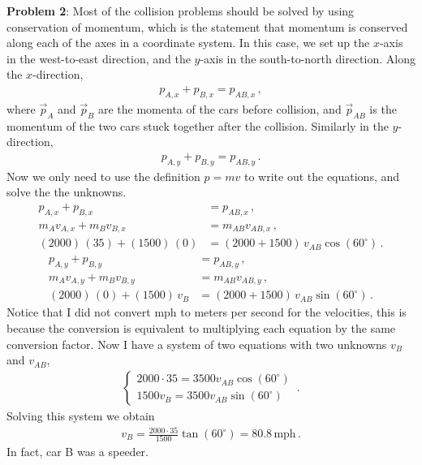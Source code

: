 \documentclass[11pt]{article}
\begin{document}
\textbf{Problem 2}: Most of the collision problems should be solved by using conservation of momentum, which is the statement that momentum is conserved along each of the axes in a coordinate system. In this case, we set up the $x$-axis in the west-to-east direction, and the $y$-axis in the south-to-north direction. Along the $x$-direction, 
\begin{align*}
p_{A,x} + p_{B,x} = p_{AB,x}\,,
\end{align*}
where $\vec{p}_A$ and $\vec{p}_B$ are the momenta of the cars before collision, and $\vec{p}_{AB}$ is the momentum of the two cars stuck together after the collision. Similarly in the $y$-direction, 
\begin{align*}
p_{A,y} + p_{B,y} = p_{AB,y}\,.
\end{align*}
Now we only need to use the definition $p = mv$ to write out the equations, and solve the the unknowns. 
\begin{align*}
p_{A,x} + p_{B,x} &= p_{AB,x}\,,\\
m_A v_{A,x} + m_B v_{B,x} &= m_{AB} v_{AB,x}\,,\\
(2000)\, (35) + (1500)\, (0)&=  (2000+1500)\, v_{AB} \cos(60^\circ)\,.
\end{align*}
\begin{align*}
p_{A,y} + p_{B,y} &= p_{AB,y}\,,\\
m_A v_{A,y} + m_B v_{B,y} &= m_{AB} v_{AB,y}\,,\\
(2000)\, (0) + (1500)\, v_B&=  (2000+1500)\, v_{AB} \sin(60^\circ)\,.
\end{align*}
Notice that I did not convert mph to meters per second for the velocities, this is because the conversion is equivalent to multiplying each equation by the same conversion factor. Now I have a system of two equations with two unknowns $v_B$ and $v_{AB}$,
\begin{align*}
\begin{cases}
2000\cdot 35 = 3500 v_{AB} \cos(60^\circ)\\
1500 v_B = 3500 v_{AB} \sin(60^\circ)
\end{cases}\,.
\end{align*}
Solving this system we obtain 
\begin{align*}
v_B = \frac{2000\cdot 35}{1500}\tan(60^\circ)=80.8\,\text{mph}\,.
\end{align*}
In fact, car B was a speeder. 
\end{document}
